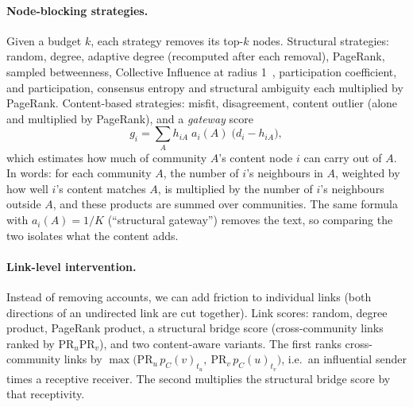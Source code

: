 \paragraph{Node-blocking strategies.}
Given a budget $k$, each strategy removes its top-$k$ nodes. Structural strategies:
random, degree, adaptive degree (recomputed after each removal), PageRank, sampled
betweenness, Collective Influence at radius 1~\citep{morone2015influence},
participation coefficient, and participation, consensus entropy and structural
ambiguity each multiplied by PageRank. Content-based strategies: misfit,
disagreement, content outlier (alone and multiplied by PageRank), and a
\emph{gateway} score
\begin{equation}
  g_i = \sum_{A} h_{iA}\; a_i(A)\; \bigl(d_i - h_{iA}\bigr),
\end{equation}
which estimates how much of community $A$'s content node $i$ can carry out of $A$.
In words: for each community $A$, the number of $i$'s neighbours in $A$, weighted by
how well $i$'s content matches $A$, is multiplied by the number of $i$'s neighbours
outside $A$, and these products are summed over communities. The
same formula with $a_i(A)=1/K$ (``structural gateway'') removes the text, so comparing
the two isolates what the content adds.

\paragraph{Link-level intervention.}
Instead of removing accounts, we can add friction to individual links (both directions
of an undirected link are cut together). Link scores: random, degree product, PageRank
product, a structural bridge score (cross-community links ranked by
$\mathrm{PR}_u\mathrm{PR}_v$), and two content-aware variants. The first ranks
cross-community links by
$\max\bigl(\mathrm{PR}_u\, p_C(v)_{t_u},\ \mathrm{PR}_v\, p_C(u)_{t_v}\bigr)$, i.e.\ an
influential sender times a receptive receiver. The second multiplies the structural
bridge score by that receptivity.

